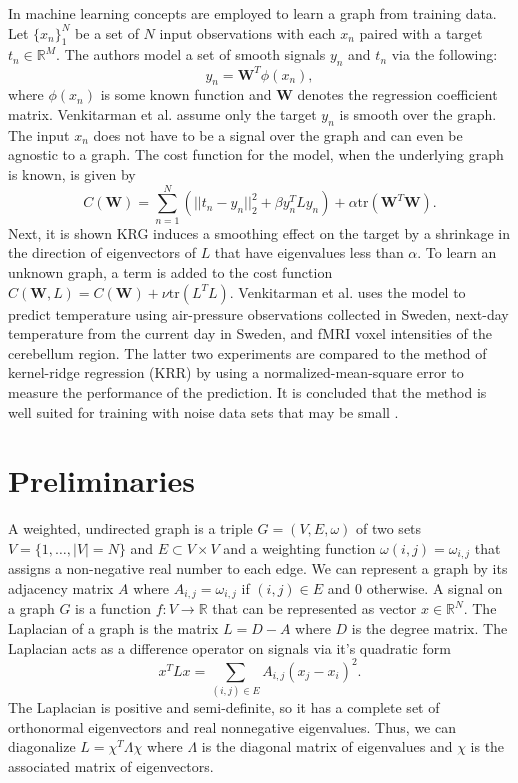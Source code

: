 \documentclass[journal]{IEEEtran}
\theoremstyle{definition}
\theoremstyle{remark}
\begin{document}
In \cite{venkitaraman2019predicting} machine learning concepts are employed to learn a graph from training data. Let $\{x_n\}_1^N$ be a set of $N$ input observations with each $x_n$ paired with a target $t_n \in \mathbb{R}^M$. The authors model a set of smooth signals $y_n$ and $t_n$ via the following: 
\begin{equation}
	\label{eq:LinearModel}
	y_n = \textbf{W}^T\phi(x_n),
\end{equation}
where $\phi(x_n)$ is some known function and $\textbf{W}$ denotes the regression coefficient matrix. Venkitarman et al. assume only the target $y_n$ is smooth over the graph. The input $x_n$ does not have to be a signal over the graph and can even be agnostic to a graph. The cost function for the model, when the underlying graph is known, is given by 
\begin{equation}
	\label{eq:cost}
	C(\textbf{W}) = \sum_{n=1}^N\left( ||t_n - y_n||_2^2 + \beta y_n^TLy_n \right) + \alpha \text{tr}(\textbf{W}^T\textbf{W}).
\end{equation}
Next, it is shown KRG induces a smoothing effect on the target by a shrinkage in the direction of eigenvectors of $L$ that have eigenvalues less than $\alpha$. To learn an unknown graph, a term is added to the cost function $C(\textbf{W}, L) = C(\textbf{W}) + \nu \text{tr}(L^TL)$.  Venkitarman et al. uses the model to predict temperature using air-pressure observations collected in Sweden, next-day temperature from the current day in Sweden, and fMRI voxel intensities of the cerebellum region. The latter two experiments are compared to the method of kernel-ridge regression (KRR) by using a normalized-mean-square error to measure the performance of the prediction. It is concluded that the method is well suited for training with noise data sets that may be small \cite{venkitaraman2019predicting}.

\section{Preliminaries}

A weighted, undirected graph is a triple $G = (V, E, \omega)$ of two sets $V = \{1, \ldots, |V| = N \}$ and $E \subset V \times V$ and a weighting function $\omega(i,j) = \omega_{i,j}$ that assigns a non-negative real number to each edge. We can represent a graph by its adjacency matrix $A$ where $A_{i,j} = \omega_{i,j}$ if $(i,j) \in E$ and $0$ otherwise. A signal on a graph $G$ is a function $f: V \rightarrow \mathbb{R}$ that can be represented as vector $x \in \mathbb{R}^N$. The Laplacian of a graph is the matrix $L = D - A$ where $D$ is the degree matrix. The Laplacian acts as a difference operator on signals via it's quadratic form
\begin{equation}
	\label{eq:quadraticform}
	x^TLx = \sum_{(i,j)\in E}A_{i,j}(x_j - x_i)^2.
\end{equation} 
The Laplacian is positive and semi-definite, so it has a complete set of orthonormal eigenvectors and real nonnegative eigenvalues. Thus, we can diagonalize $L = \chi^T\Lambda \chi$ where $\Lambda$ is the diagonal matrix of eigenvalues and $\chi$ is the associated matrix of eigenvectors. 
\end{document}
